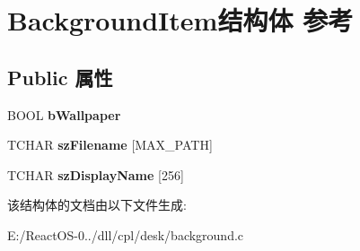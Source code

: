 \hypertarget{struct_background_item}{}\section{Background\+Item结构体 参考}
\label{struct_background_item}
\subsection*{Public 属性}
\begin{DoxyCompactItemize}
\item 
\mbox{\label{struct_background_item_a09ffddcec19187a6c01fed7a9faaeb6f}} 
B\+O\+OL {\bfseries b\+Wallpaper}
\item 
\mbox{\label{struct_background_item_aa6df7daee990ad59086be77045d6bddf}} 
T\+C\+H\+AR {\bfseries sz\+Filename} \mbox{[}M\+A\+X\+\_\+\+P\+A\+TH\mbox{]}
\item 
\mbox{\label{struct_background_item_abf2cfe46c2d0cc0d64f5150c9476ed01}} 
T\+C\+H\+AR {\bfseries sz\+Display\+Name} \mbox{[}256\mbox{]}
\end{DoxyCompactItemize}


该结构体的文档由以下文件生成\+:\begin{DoxyCompactItemize}
\item 
E\+:/\+React\+O\+S-\/0../dll/cpl/desk/background.\+c\end{DoxyCompactItemize}
